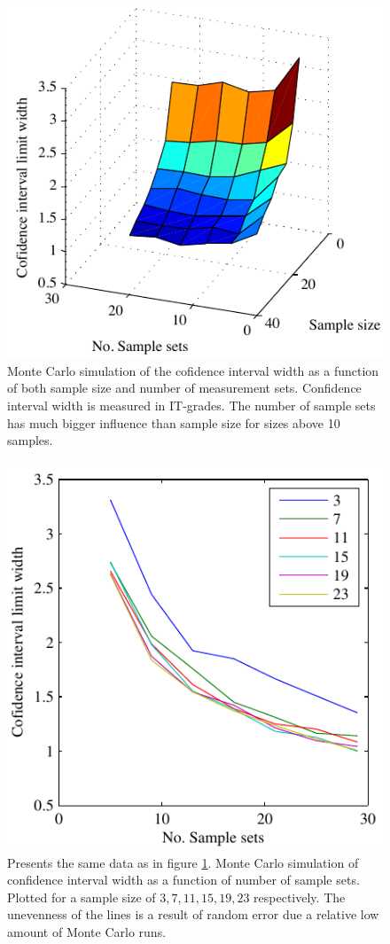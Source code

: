 \documentclass[aip,amsmath, reprint, author-year]{revtex4-1}
\begin{document}
\begin{figure}
\includegraphics{CLW90_surf.pdf}
\caption{\label{fig:cl_surf} Monte Carlo simulation of the cofidence interval width as a function of both sample size and number of measurement sets. Confidence interval width is measured in IT-grades. The number of sample sets has much bigger influence than sample size for sizes above 10 samples.}
\end{figure}

\begin{figure}
\includegraphics{CLW90_lines.pdf}
\caption{\label{fig:cl_line} Presents the same data as in figure \ref{fig:cl_surf}. Monte Carlo simulation of confidence interval width as a function of number of sample sets. Plotted for a sample size of ${3,7,11,15,19,23}$ respectively. The unevenness of the lines is a result of random error due a relative low amount of Monte Carlo runs. }
\end{figure}
\end{document}
